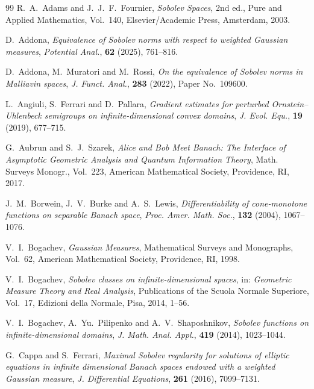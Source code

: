 \documentclass[12pt]{article}
\theoremstyle{plain}
\theoremstyle{definition}
\theoremstyle{remark}
\numberwithin{equation}{section}
\begin{document}
\begin{thebibliography}{99}
R.~A.~Adams and J.~J.~F.~Fournier,
\emph{Sobolev Spaces}, 2nd ed.,
Pure and Applied Mathematics, Vol.~140,
Elsevier/Academic Press, Amsterdam, 2003.

D.~Addona,
\emph{Equivalence of Sobolev norms with respect to weighted Gaussian
	measures},
{\sl Potential Anal.}, \textbf{62} (2025), 761--816.

D.~Addona, M.~Muratori and M.~Rossi,
\emph{On the equivalence of Sobolev norms in Malliavin spaces},
{\sl J. Funct. Anal.}, \textbf{283} (2022), Paper No.~109600.

L.~Angiuli, S.~Ferrari and D.~Pallara,
\emph{Gradient estimates for perturbed Ornstein--Uhlenbeck semigroups
	on infinite-dimensional convex domains},
{\sl J. Evol. Equ.}, \textbf{19} (2019), 677--715.

G.~Aubrun and S.~J.~Szarek,
\emph{Alice and Bob Meet Banach: The Interface of Asymptotic Geometric
	Analysis and Quantum Information Theory},
Math. Surveys Monogr., Vol.~223,
American Mathematical Society, Providence, RI, 2017.

J.~M.~Borwein, J.~V.~Burke and A.~S.~Lewis,
\emph{Differentiability of cone-monotone functions on separable Banach
	space},
{\sl Proc. Amer. Math. Soc.}, \textbf{132} (2004), 1067--1076.

V.~I.~Bogachev,
\emph{Gaussian Measures},
Mathematical Surveys and Monographs, Vol.~62,
American Mathematical Society, Providence, RI, 1998.

V.~I.~Bogachev,
\emph{Sobolev classes on infinite-dimensional spaces},
in: \emph{Geometric Measure Theory and Real Analysis},
Publications of the Scuola Normale Superiore, Vol.~17,
Edizioni della Normale, Pisa, 2014, 1--56.

V.~I.~Bogachev, A.~Yu.~Pilipenko and A.~V.~Shaposhnikov,
\emph{Sobolev functions on infinite-dimensional domains},
{\sl J. Math. Anal. Appl.}, \textbf{419} (2014), 1023--1044.

G.~Cappa and S.~Ferrari,
\emph{Maximal Sobolev regularity for solutions of elliptic equations
	in infinite dimensional Banach spaces endowed with a weighted
	Gaussian measure},
{\sl J. Differential Equations}, \textbf{261} (2016), 7099--7131.


\end{thebibliography}
\end{document}
